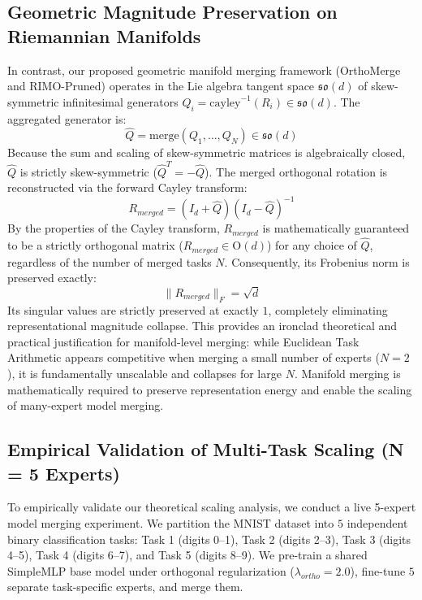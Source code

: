 \subsection{Geometric Magnitude Preservation on Riemannian Manifolds}
In contrast, our proposed geometric manifold merging framework (OrthoMerge and RIMO-Pruned) operates in the Lie algebra tangent space $\mathfrak{so}(d)$ of skew-symmetric infinitesimal generators $Q_i = \text{cayley}^{-1}(R_i) \in \mathfrak{so}(d)$. The aggregated generator is:
\begin{equation}
\hat{Q} = \text{merge}(Q_1, \dots, Q_N) \in \mathfrak{so}(d)
\end{equation}
Because the sum and scaling of skew-symmetric matrices is algebraically closed, $\hat{Q}$ is strictly skew-symmetric ($\hat{Q}^T = -\hat{Q}$). The merged orthogonal rotation is reconstructed via the forward Cayley transform:
\begin{equation}
R_{merged} = (I_d + \hat{Q})(I_d - \hat{Q})^{-1}
\end{equation}
By the properties of the Cayley transform, $R_{merged}$ is mathematically guaranteed to be a strictly orthogonal matrix ($R_{merged} \in \mathrm{O}(d)$) for any choice of $\hat{Q}$, regardless of the number of merged tasks $N$. Consequently, its Frobenius norm is preserved exactly:
\begin{equation}
\|R_{merged}\|_F = \sqrt{d}
\end{equation}
Its singular values are strictly preserved at exactly $1$, completely eliminating representational magnitude collapse. This provides an ironclad theoretical and practical justification for manifold-level merging: while Euclidean Task Arithmetic appears competitive when merging a small number of experts ($N = 2$), it is fundamentally unscalable and collapses for large $N$. Manifold merging is mathematically required to preserve representation energy and enable the scaling of many-expert model merging.

\subsection{Empirical Validation of Multi-Task Scaling (N = 5 Experts)}
To empirically validate our theoretical scaling analysis, we conduct a live 5-expert model merging experiment. We partition the MNIST dataset into $5$ independent binary classification tasks: Task 1 (digits 0--1), Task 2 (digits 2--3), Task 3 (digits 4--5), Task 4 (digits 6--7), and Task 5 (digits 8--9). We pre-train a shared SimpleMLP base model under orthogonal regularization ($\lambda_{ortho} = 2.0$), fine-tune $5$ separate task-specific experts, and merge them. 

